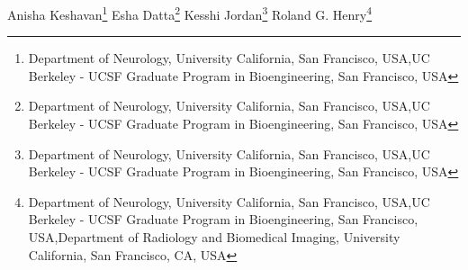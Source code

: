 \iflatexml
Anisha Keshavan\footnote[1,2]{Department of Neurology, University California, San Francisco,  USA,UC Berkeley - UCSF Graduate Program in Bioengineering, San Francisco, USA}
Esha Datta\footnote[1,2]{Department of Neurology, University California, San Francisco,  USA,UC Berkeley - UCSF Graduate Program in Bioengineering, San Francisco, USA}
Kesshi Jordan\footnote[1,2]{Department of Neurology, University California, San Francisco,  USA,UC Berkeley - UCSF Graduate Program in Bioengineering, San Francisco, USA}
Roland G. Henry\footnote[1,2,3]{Department of Neurology, University California, San Francisco,  USA,UC Berkeley - UCSF Graduate Program in Bioengineering, San Francisco, USA,Department of Radiology and Biomedical Imaging, University California, San Francisco, CA, USA}

\else %

\author[l1,l2]{Anisha Keshavan}

\author[l1,l2]{Esha Datta}

\author[l1,l2]{Esha Datta}

\author[l1,l2]{Kesshi Jordan}

\author[l1,l2,3]{Roland G. Henry}

\address[l1]{Department of Neurology, University California, San Francisco,  USA}
\address[l2]{UC Berkeley - UCSF Graduate Program in Bioengineering, San Francisco, USA}

\address[3]{Department of Radiology and Biomedical Imaging, University California, San Francisco, CA, USA}

\fi